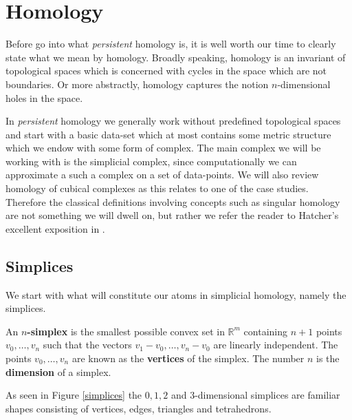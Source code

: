 \chapter{Homology}
Before go into what \textit{persistent} homology is, it is well worth our time to clearly state what we mean by homology. Broadly speaking, homology is an invariant of topological spaces which is concerned with cycles in the space which are not boundaries. Or more abstractly, homology captures the notion $n$-dimensional holes in the space.

In \textit{persistent} homology we generally work without predefined topological spaces and start with a basic data-set which at most contains some metric structure which we endow with some form of complex. The main complex we will be working with is the simplicial complex, since computationally we can approximate a such a complex on a set of data-points. We will also review homology of cubical complexes as this relates to one of the case studies. Therefore the classical definitions involving concepts such as singular homology are not something we will dwell on, but rather we refer the reader to Hatcher's excellent exposition in \cite{hatcher2002}.


\section{Simplices}
We start with what will constitute our atoms in simplicial homology, namely the simplices.
\begin{definition}
An \textbf{$n$-simplex} is the smallest possible convex set in $\mathbb{R}^{m}$ containing $n+1$ points $v_{0},\dots,v_{n}$ such that the vectors $v_{1}-v_{0}, \dots, v_{n} - v_{0}$ are linearly independent. The points $v_{0},\dots,v_{n}$ are known as the \textbf{vertices} of the simplex. The number $n$ is the \textbf{dimension} of a simplex.
\end{definition}
As seen in Figure \ref{simplices} the $0,1,2$ and $3$-dimensional simplices are familiar shapes consisting of vertices, edges, triangles and tetrahedrons.


